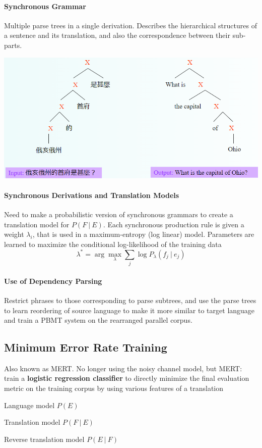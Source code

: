 \documentclass[10pt]{report}
\begin{document}
\paragraph{Synchronous Grammar} Multiple parse trees in a single derivation. Describes the hierarchical structures of a sentence and its translation, and also the correspondence between their sub-parts.
\begin{center}
	\includegraphics[scale=0.5]{94.png}
\end{center}
\paragraph{Synchronous Derivations and Translation Models} Need to make a probabilistic version of synchronous grammars to create a translation model for $P(F\:|\:E)$. Each synchronous production rule is given a weight $\lambda_i$, that is used in a maximum-entropy (log linear) model. Parameters are learned to maximize the conditional log-likelihood of the training data
$$\lambda^* = \arg\max_\lambda\sum_j\log P_\lambda(f_j\:|\:e_j)$$
\paragraph{Use of Dependency Parsing} Restrict phrases to those corresponding to parse subtrees, and use the parse trees to learn reordering of source language to make it more similar to target language and train a PBMT system on the rearranged parallel corpus.
\subsection{Minimum Error Rate Training} Also known as MERT. No longer using the noisy channel model, but MERT: train a \textbf{logistic regression classifier} to directly minimize the final evaluation metric on the training corpus by using various features of a translation
\begin{list}{}{}
	\item Language model $P(E)$
	\item Translation model $P(F\:|\:E)$
	\item Reverse translation model $P(E\:|\:F)$
\end{list}
\end{document}
